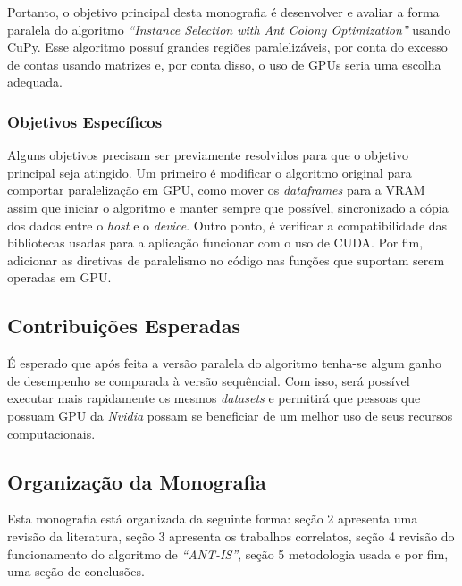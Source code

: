 Portanto, o objetivo principal desta monografia é desenvolver e avaliar a forma paralela do algoritmo \emph{``Instance Selection with Ant Colony 
Optimization''} usando {CuPy}. Esse algoritmo possuí grandes regiões paralelizáveis, por conta do excesso de
contas usando matrizes e, por conta disso, o uso de GPUs seria uma escolha adequada.


\subsubsection{Objetivos Específicos}
Alguns objetivos precisam ser previamente resolvidos para que o objetivo principal seja atingido. Um primeiro é modificar
o algoritmo original para comportar paralelização em GPU, como mover os \emph{dataframes} para a {VRAM} assim que 
iniciar o algoritmo e manter sempre que possível, sincronizado a cópia dos dados entre o \emph{host} e o \emph{device}.
Outro ponto, é verificar a compatibilidade das bibliotecas usadas para a aplicação funcionar com o uso de {CUDA}.
Por fim, adicionar as diretivas de paralelismo no código nas funções que suportam serem operadas em GPU.

\subsection{Contribuições Esperadas}

É esperado que após feita a versão paralela do algoritmo tenha-se algum ganho de desempenho se comparada à versão
sequêncial. Com isso, será possível executar mais rapidamente os mesmos \emph{datasets} e permitirá que pessoas que
possuam GPU da \emph{Nvidia} possam se beneficiar de um melhor uso de seus recursos computacionais.

\subsection{Organização da Monografia}

Esta monografia está organizada da seguinte forma: seção 2 apresenta uma revisão da literatura, 
seção 3 apresenta os trabalhos correlatos, seção 4 revisão do funcionamento do algoritmo de
\emph{``ANT-IS''}, seção 5 metodologia usada e por fim, uma seção de conclusões.